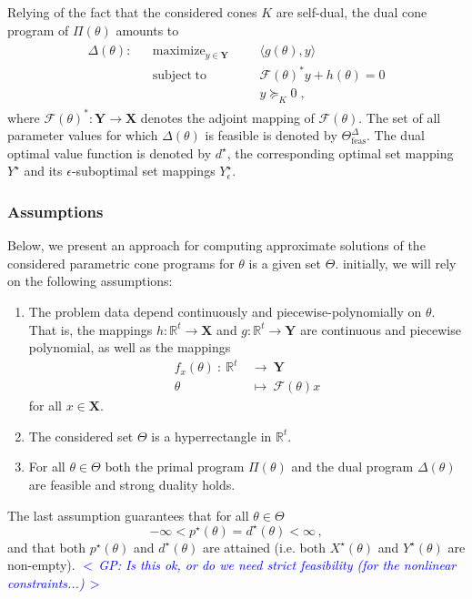 \documentclass{article}
\newcommand{\R}{\mathbb{R}}        %
\newcommand{\ppar}{\theta}                  %
\newcommand{\Ppar}{\Theta}                  %
\newcommand{\X}{\mathbf{X}}
\newcommand{\Y}{\mathbf{Y}}
\newcommand{\calF}{\mathcal{F}}
\newcommand{\Dfeas}{\Theta_{\text{feas}}^\Delta}
\DeclareMathOperator*{\maximize}{maximize}
\DeclareMathOperator*{\subj}{subject\;to}
\newcommand{\commentGP}[1]{\noindent \textcolor{blue}{\emph{$<\,$GP: #1$\,>$}}}%
\begin{document}
Relying of the fact that the considered cones $K$ are self-dual, the dual cone program of $\Pi(\ppar)$ amounts to
\begin{gather}\label{eq:parametric_dual}
\begin{aligned}
\Delta(\ppar): && \maximize_{y\in\Y} &&& \langle g(\ppar) , y \rangle\\
               && \subj              &&& \calF(\ppar)^* y + h(\ppar)= 0\\
               &&                    &&& y \succeq_K 0  \;,
\end{aligned}
\end{gather}
where $\calF(\ppar)^*: \Y\rightarrow\X$ denotes the adjoint mapping of $\calF(\ppar)$. The set of all parameter values for which $\Delta(\ppar)$ is feasible is denoted by $\Dfeas$. The dual optimal value function is denoted by $d^\star$, the corresponding optimal set mapping $Y^\star$ and its $\epsilon$-suboptimal set mappings $Y^\star_\epsilon$.


\subsubsection*{Assumptions}

Below, we present an approach for computing approximate solutions of the considered parametric cone programs for $\ppar$ is a given set $\Ppar$. initially, we will rely on the following assumptions:
\begin{enumerate}[\bf\text{A}1.]
\item\label{ass_pdep} The problem data depend continuously and piecewise-polynomially on $\ppar$. That is, the mappings $h:\R^t\rightarrow\X$ and $g:\R^t\rightarrow\Y$ are continuous and piecewise polynomial, as well as the mappings
    \begin{align*}
    f_x(\ppar) ~:~ \R^t~  &\rightarrow~\Y\\
                   \ppar~ &\mapsto~\calF(\ppar)x
    \end{align*}
    for all $x\in\X$.
\item\label{ass_Ppar} The considered set $\Ppar$ is a hyperrectangle in $\R^t$.
\item\label{ass_feas} For all $\ppar\in\Ppar$ both the primal program $\Pi(\ppar)$ and the dual program $\Delta(\ppar)$ are feasible and strong duality holds.
\end{enumerate}
The last assumption guarantees that for all $\ppar\in\Ppar$
\[ -\infty < p^\star(\ppar) = d^\star(\ppar) < \infty \,,%
\]
and that both $p^\star(\ppar)$ and $d^\star(\ppar)$ are attained (i.e. both $X^\star(\ppar)$ and $Y^\star(\ppar)$ are non-empty). \commentGP{Is this ok, or do we need strict feasibility (for the nonlinear constraints...)}
\end{document}
